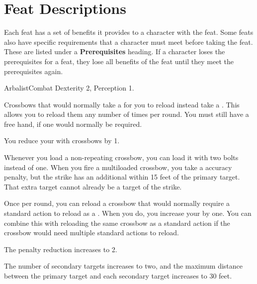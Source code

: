 \section{Feat Descriptions}
  Each feat has a set of benefits it provides to a character with the feat.
  Some feats also have specific requirements that a character must meet before taking the feat.
  These are listed under a \textbf{Prerequisites} heading.
  If a character loses the prerequisites for a feat, they lose all benefits of the feat until they meet the prerequisites again.

  \begin{feat}{Arbalist}{Combat}
    \featpre Dexterity 2, Perception 1.

     Crossbows that would normally take a  for you to reload instead take a .
    This allows you to reload them any number of times per round.
    You must still have a free hand, if one would normally be required.

     You reduce your  with crossbows by 1.

     Whenever you load a non-repeating crossbow, you can load it with two bolts instead of one.
    When you fire a multiloaded crossbow, you take a  accuracy penalty, but the strike has an additional  within 15 feet of the primary target.
    That extra target cannot already be a target of the strike.

     Once per round, you can reload a crossbow that would normally require a standard action to reload as a .
    When you do, you increase your  by one.
    You can combine this with reloading the same crossbow as a standard action if the crossbow would need multiple standard actions to reload.

     The penalty reduction increases to 2.

     The number of secondary targets increases to two, and the maximum distance between the primary target and each secondary target increases to 30 feet.
  \end{feat}

